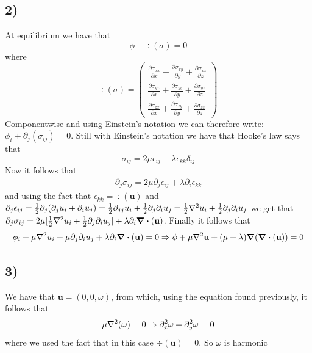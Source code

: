 \documentclass[10pt,a4paper]{book}
\begin{document}
\subsection*{2)}
At equilibrium we have that 
$$\phi+\div(\sigma)=0$$
where $$\div(\sigma)=\begin{pmatrix}
\frac{\partial \sigma_{xx}}{\partial x}+\frac{\partial \sigma_{xy}}{\partial y}+\frac{\partial \sigma_{xz}}{\partial z}\\
\frac{\partial \sigma_{yx}}{\partial x}+\frac{\partial \sigma_{yy}}{\partial y}+\frac{\partial \sigma_{yz}}{\partial z}\\
\frac{\partial \sigma_{zx}}{\partial x}+\frac{\partial \sigma_{zy}}{\partial y}+\frac{\partial \sigma_{zz}}{\partial z}
\end{pmatrix}$$Componentwise and using Einstein's notation we can therefore write: $\phi_i+\partial_j(\sigma_{ij})=0$.
Still with Einstein's notation we have that Hooke's law says that 
$$\sigma_{ij}=2\mu \epsilon_{ij}+\lambda \epsilon_{kk}\delta_{ij}$$
Now it follows that 
\begin{align*}
\partial_j\sigma_{ij}=2\mu\partial_j\epsilon_{ij}+\lambda \partial_i\epsilon_{kk}
\end{align*}
and using the fact that $\epsilon_{kk}=\div(\mathbf{u})$ and $\partial_j\epsilon_{ij}=\frac{1}{2}\partial_j(\partial_j u_i+\partial_i u_j)=\frac{1}{2}\partial_{jj}u_i+\frac{1}{2}\partial_j\partial_i u_j=\frac{1}{2}\laplacian u_i+\frac{1}{2}\partial_j\partial_i u_j$
we get that
$\partial_j\sigma_{ij}=2\mu[ \frac{1}{2}\laplacian u_i+\frac{1}{2}\partial_j\partial_i u_j]+\lambda\partial_i\div(\mathbf{u})$. Finally it follows that
\begin{align*}
\phi_i+\mu\laplacian u_i+\mu\partial_j\partial_i u_j +\lambda\partial_i\div(\mathbf{u})=0\Rightarrow \phi+\mu\laplacian \mathbf{u}+(\mu+\lambda)\grad(\div(\mathbf{u}))=0
\end{align*}



\subsection*{3)}
We have that $\mathbf{u}=(0,0,\omega)$,
from which, using the equation found previously, it follows that 
$$\mu\laplacian(\omega)=0\Rightarrow\partial^2_x\omega+\partial^2_y\omega=0$$
where we used the fact that in this case $\div(\mathbf{u})=0$. So $\omega$ is harmonic

\end{document}
